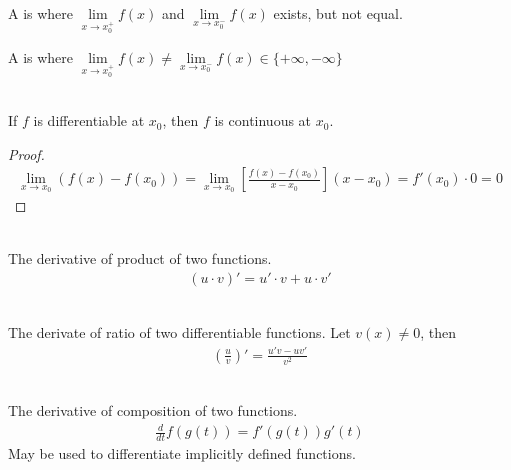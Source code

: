 \begin{definition} A  is where $\lim\limits_{x \rightarrow x^+_0} f(x)$ and $\lim\limits_{x \rightarrow x^-_0} f(x)$ exists, but not equal.
\end{definition}

\begin{definition} A  is where $\lim\limits_{x \rightarrow x^+_0} f(x) \neq \lim\limits_{x \rightarrow x^-_0} f(x) \in \{+\infty, -\infty\}$
\end{definition}

\begin{theorem} \\
If $f$ is differentiable at $x_0$, then $f$ is continuous at $x_0$.
\begin{proof}
\begin{align}
\lim_{x \rightarrow x_0} (f(x) - f(x_0)) = \lim_{x \rightarrow x_0} \left[ \frac{f(x) - f(x_0)}{x - x_0} \right](x - x_0) = f'(x_0) \cdot 0 = 0 \nonumber
\end{align}
\end{proof}
\end{theorem}

\begin{definition} \\
The derivative of product of two functions.
\begin{align}
(u \cdot v)' = u' \cdot v + u \cdot v' \nonumber
\end{align}
\end{definition}

\begin{definition} \\
The derivate of ratio of two differentiable functions. Let $v(x) \neq 0$, then
\begin{align}
\left( \frac{u}{v} \right)' = \frac{u'v - uv'}{v^2} \nonumber
\end{align}
\end{definition}

\begin{definition} \\
The derivative of composition of two functions.
\begin{align}
\frac{d}{dt} f(g(t)) = f'(g(t))g'(t) \nonumber
\end{align}
May be used to differentiate implicitly defined functions.
\end{definition}


